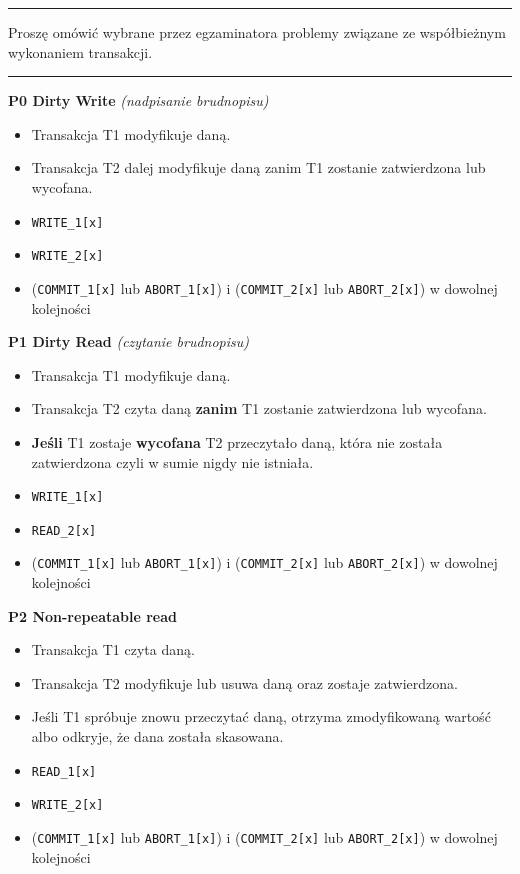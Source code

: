 \documentclass[a5paper,6pt]{article}
\newcommand{\horrule}[1]{\rule{\linewidth}{#1}}
\begin{document}
    \horrule{0.5pt}
    Proszę omówić wybrane przez egzaminatora problemy związane ze współbieżnym
    wykonaniem transakcji.\\
    \horrule{0.5pt}

    \textbf{P0 Dirty Write} \textit{(nadpisanie brudnopisu)}
    \begin{itemize}
        \item Transakcja T1 modyfikuje daną.
        \item Transakcja T2 dalej modyfikuje daną zanim T1 zostanie zatwierdzona
              lub wycofana.
        \item \texttt{WRITE\_1[x]}
        \item \texttt{WRITE\_2[x]}
        \item (\texttt{COMMIT\_1[x]} lub \texttt{ABORT\_1[x]}) i
              (\texttt{COMMIT\_2[x]} lub \texttt{ABORT\_2[x]})
              w dowolnej kolejności
    \end{itemize}

    \textbf{P1 Dirty Read} \textit{(czytanie brudnopisu)}
    \begin{itemize}
        \item Transakcja T1 modyfikuje daną.
        \item Transakcja T2 czyta daną \textbf{zanim} T1 zostanie zatwierdzona
              lub wycofana.
        \item \textbf{Jeśli} T1 zostaje \textbf{wycofana} T2 przeczytało daną,
              która nie została zatwierdzona czyli w sumie nigdy nie istniała.
        \item \texttt{WRITE\_1[x]}
        \item \texttt{READ\_2[x]}
        \item (\texttt{COMMIT\_1[x]} lub \texttt{ABORT\_1[x]}) i
              (\texttt{COMMIT\_2[x]} lub \texttt{ABORT\_2[x]})
              w dowolnej kolejności
    \end{itemize}

    \textbf{P2 Non-repeatable read}
    \begin{itemize}
        \item Transakcja T1 czyta daną.
        \item Transakcja T2 modyfikuje lub usuwa daną oraz zostaje zatwierdzona.
        \item Jeśli T1 spróbuje znowu przeczytać daną, otrzyma zmodyfikowaną
              wartość albo odkryje, że dana została skasowana.
        \item \texttt{READ\_1[x]}
        \item \texttt{WRITE\_2[x]}
        \item (\texttt{COMMIT\_1[x]} lub \texttt{ABORT\_1[x]}) i
              (\texttt{COMMIT\_2[x]} lub \texttt{ABORT\_2[x]})
              w dowolnej kolejności
    \end{itemize}
\end{document}
